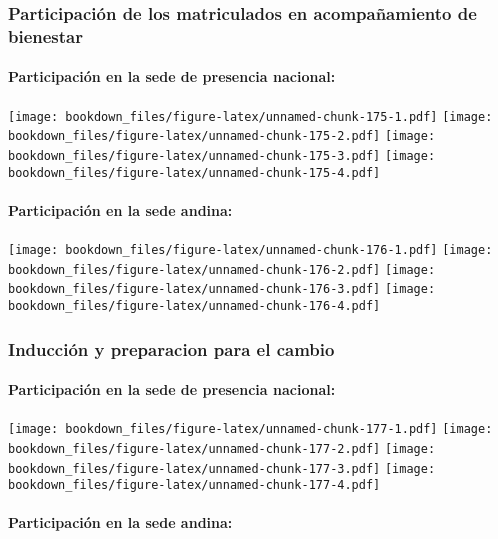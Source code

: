 \documentclass[]{article}
\let\oldparagraph\paragraph
\renewcommand{\paragraph}[1]{\oldparagraph{#1}\mbox{}}
\theoremstyle{definition}
\theoremstyle{definition}
\theoremstyle{definition}
\theoremstyle{remark}
\begin{document}
\subsubsection{Participación de los matriculados en acompañamiento de
bienestar}\label{participacion-de-los-matriculados-en-acompanamiento-de-bienestar}

\paragraph{Participación en la sede de presencia
nacional:}\label{participacion-en-la-sede-de-presencia-nacional}

\texttt{[image: bookdown\_files/figure-latex/unnamed-chunk-175-1.pdf]}
\texttt{[image: bookdown\_files/figure-latex/unnamed-chunk-175-2.pdf]}
\texttt{[image: bookdown\_files/figure-latex/unnamed-chunk-175-3.pdf]}
\texttt{[image: bookdown\_files/figure-latex/unnamed-chunk-175-4.pdf]}

\paragraph{Participación en la sede
andina:}\label{participacion-en-la-sede-andina}

\texttt{[image: bookdown\_files/figure-latex/unnamed-chunk-176-1.pdf]}
\texttt{[image: bookdown\_files/figure-latex/unnamed-chunk-176-2.pdf]}
\texttt{[image: bookdown\_files/figure-latex/unnamed-chunk-176-3.pdf]}
\texttt{[image: bookdown\_files/figure-latex/unnamed-chunk-176-4.pdf]}

\subsubsection{Inducción y preparacion para el
cambio}\label{induccion-y-preparacion-para-el-cambio}

\paragraph{Participación en la sede de presencia
nacional:}\label{participacion-en-la-sede-de-presencia-nacional-1}

\texttt{[image: bookdown\_files/figure-latex/unnamed-chunk-177-1.pdf]}
\texttt{[image: bookdown\_files/figure-latex/unnamed-chunk-177-2.pdf]}
\texttt{[image: bookdown\_files/figure-latex/unnamed-chunk-177-3.pdf]}
\texttt{[image: bookdown\_files/figure-latex/unnamed-chunk-177-4.pdf]}

\paragraph{Participación en la sede
andina:}\label{participacion-en-la-sede-andina-1}
\end{document}
